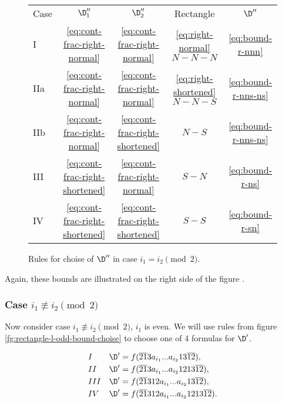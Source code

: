 \begin{figure}[ht]
	\centering
		\begin{tabular}{| l | c c c | c |}
			\cline{1-5}
			Case & $\D_1''$ & $\D_2''$ & Rectangle & $\D''$ \\
			\cline{1-5}
			I & \ref{eq:cont-frac-right-normal} & \ref{eq:cont-frac-right-normal} & \ref{eq:right-normal} $N-N-N$ & \ref{eq:bound-r-nnn} \\
			IIa & \ref{eq:cont-frac-right-normal} & \ref{eq:cont-frac-right-normal} & \ref{eq:right-shortened} $N-N-S$ & \ref{eq:bound-r-nns-ns} \\
			IIb & \ref{eq:cont-frac-right-normal} & \ref{eq:cont-frac-right-shortened} & $N-S$ & \ref{eq:bound-r-nns-ns} \\
			III & \ref{eq:cont-frac-right-shortened} & \ref{eq:cont-frac-right-normal} & $S-N$ & \ref{eq:bound-r-ns} \\
			IV & \ref{eq:cont-frac-right-shortened} & \ref{eq:cont-frac-right-shortened} & $S-S$ & \ref{eq:bound-r-sn} \\
			\cline{1-5}
		\end{tabular}
	\caption{Rules for choise of $\D''$ in case $i_1 = i_2 \pmod 2$.}
	\label{fg:rectangle-r-bound-choise}
\end{figure}

Again, these bounds are illustrated on the right side of the figure .

\subsubsection{Case $i_1 \not\equiv i_2 \pmod 2$}

Now consider case $i_1 \not\equiv i_2 \pmod 2$, $i_1$ is even.
We will use rules from figure \ref{fg:rectangle-l-odd-bound-choise} to choose one of 4 formulas for $\D'$.

\begin{subequations}
	\begin{align}
		\label{eq:bound-l-odd-nn}
		&&&&& I & \D' & = f(\overline{21}3a_{i_1}... a_{i_2}13\overline{12}), &&&& \\
		\label{eq:bound-l-odd-ns}
		&&&&& II & \D' & = f(\overline{21}3a_{i_1}... a_{i_2}1213\overline{12}), &&&& \\
		\label{eq:bound-l-odd-sn}
		&&&&& III & \D' & = f(\overline{21}312a_{i_1}... a_{i_2}13\overline{12}), &&&& \\
		\label{eq:bound-l-odd-ss}
		&&&&& IV & \D' & = f(\overline{21}312a_{i_1}... a_{i_2}1213\overline{12}). &&&&
	\end{align}
\end{subequations}

